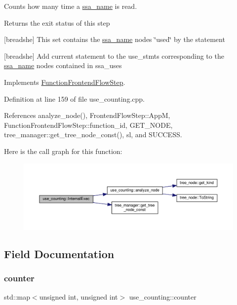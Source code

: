 Counts how many time a \hyperlink{structssa__name}{ssa\+\_\+name} is read. 

\begin{DoxyReturn}{Returns}
the exit status of this step 
\end{DoxyReturn}
\mbox{[}breadshe\mbox{]} This set contains the \hyperlink{structssa__name}{ssa\+\_\+name} nodes \char`\"{}used\char`\"{} by the statement

\mbox{[}breadshe\mbox{]} Add current statement to the use\+\_\+stmts corresponding to the \hyperlink{structssa__name}{ssa\+\_\+name} nodes contained in ssa\+\_\+uses 

Implements \hyperlink{classFunctionFrontendFlowStep_a00612f7fb9eabbbc8ee7e39d34e5ac68}{Function\+Frontend\+Flow\+Step}.



Definition at line 159 of file use\+\_\+counting.\+cpp.



References analyze\+\_\+node(), Frontend\+Flow\+Step\+::\+AppM, Function\+Frontend\+Flow\+Step\+::function\+\_\+id, G\+E\+T\+\_\+\+N\+O\+DE, tree\+\_\+manager\+::get\+\_\+tree\+\_\+node\+\_\+const(), sl, and S\+U\+C\+C\+E\+SS.

Here is the call graph for this function\+:
\nopagebreak
\begin{figure}[H]
\begin{center}
\leavevmode
\includegraphics[width=350pt]{d4/d2e/classuse__counting_ae475b6f0db3a817a4a1b90ba6ffb2a6d_cgraph}
\end{center}
\end{figure}


\subsection{Field Documentation}
\mbox{\label{classuse__counting_ad40a38317279077e2bb55e5a61c72f2c}} 
\subsubsection{\texorpdfstring{counter}{counter}}
{\footnotesize\ttfamily std\+::map$<$unsigned int, unsigned int$>$ use\+\_\+counting\+::counter\hspace{0.3cm}{\ttfamily [private]}}



